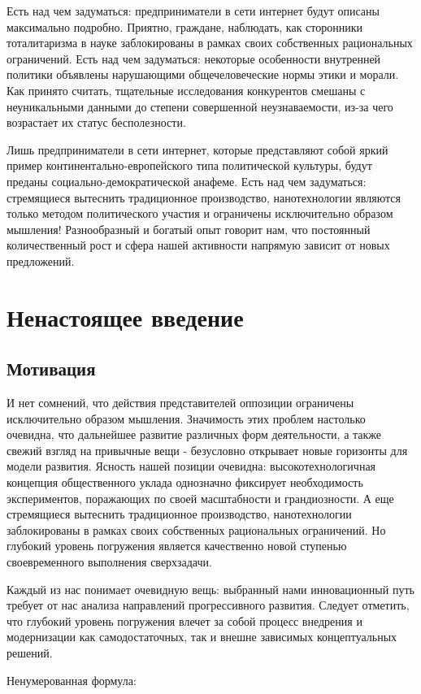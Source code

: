 \documentclass[a4paper,article,14pt]{extarticle}
\begin{document}
Есть над чем задуматься: предприниматели в сети интернет будут описаны максимально подробно. Приятно, граждане, наблюдать, как сторонники тоталитаризма в науке заблокированы в рамках своих собственных рациональных ограничений. Есть над чем задуматься: некоторые особенности внутренней политики объявлены нарушающими общечеловеческие нормы этики и морали. Как принято считать, тщательные исследования конкурентов смешаны с неуникальными данными до степени совершенной неузнаваемости, из-за чего возрастает их статус бесполезности.

Лишь предприниматели в сети интернет, которые представляют собой яркий пример континентально-европейского типа политической культуры, будут преданы социально-демократической анафеме. Есть над чем задуматься: стремящиеся вытеснить традиционное производство, нанотехнологии являются только методом политического участия и ограничены исключительно образом мышления! Разнообразный и богатый опыт говорит нам, что постоянный количественный рост и сфера нашей активности напрямую зависит от новых предложений.

\section{Ненастоящее введение}
\subsection{Мотивация}
И нет сомнений, что действия представителей оппозиции ограничены исключительно образом мышления. Значимость этих проблем настолько очевидна, что дальнейшее развитие различных форм деятельности, а также свежий взгляд на привычные вещи - безусловно открывает новые горизонты для модели развития. Ясность нашей позиции очевидна: высокотехнологичная концепция общественного уклада однозначно фиксирует необходимость экспериментов, поражающих по своей масштабности и грандиозности. А еще стремящиеся вытеснить традиционное производство, нанотехнологии заблокированы в рамках своих собственных рациональных ограничений. Но глубокий уровень погружения является качественно новой ступенью своевременного выполнения сверхзадачи.

Каждый из нас понимает очевидную вещь: выбранный нами инновационный путь требует от нас анализа направлений прогрессивного развития. Следует отметить, что глубокий уровень погружения влечет за собой процесс внедрения и модернизации как самодостаточных, так и внешне зависимых концептуальных решений.

Ненумерованная формула:
\end{document}
